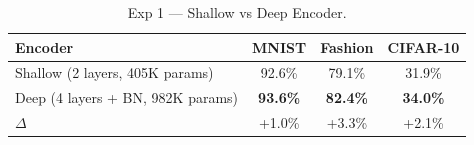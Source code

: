 \begin{table}[h!]
\centering
\caption{Exp 1 --- Shallow vs Deep Encoder.}
\begin{tabular}{l c c c}
\hline
\textbf{Encoder} & \textbf{MNIST} & \textbf{Fashion} & \textbf{CIFAR-10} \\
\hline
Shallow (2 layers, 405K params) & 92.6\% & 79.1\% & 31.9\% \\
Deep (4 layers + BN, 982K params) & \textbf{93.6\%} & \textbf{82.4\%} & \textbf{34.0\%} \\
$\Delta$ & +1.0\% & +3.3\% & +2.1\% \\
\hline
\end{tabular}
\label{tab:cpu_exp1}
\end{table}

